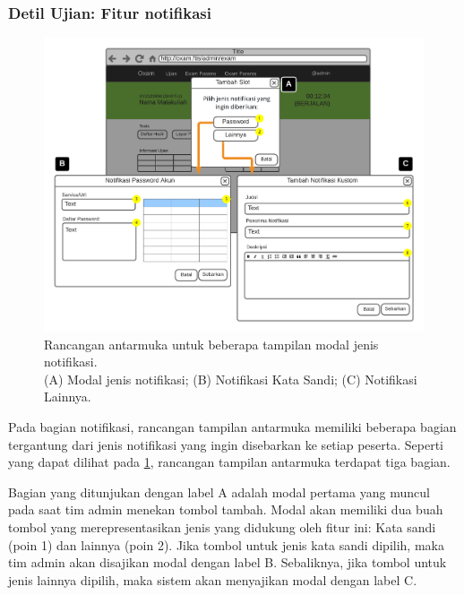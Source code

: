 \subsubsection{Detil Ujian: Fitur notifikasi}
    \begin{figure}
        \centering
        \includegraphics{Gambar/mockups/Mockup--Admin - Notif.pdf}
        \caption{Rancangan antarmuka untuk beberapa tampilan modal jenis notifikasi. \\
            (A) Modal jenis notifikasi; (B) Notifikasi Kata Sandi; (C) Notifikasi Lainnya.}
        \label{fig:mockup_admin_exam_det_notif}
    \end{figure}
    
    Pada bagian notifikasi, rancangan tampilan antarmuka memiliki beberapa bagian tergantung dari
    jenis notifikasi yang ingin disebarkan ke setiap peserta. Seperti yang dapat dilihat pada
    \ref{fig:mockup_admin_exam_det_notif}, rancangan tampilan antarmuka terdapat tiga bagian.
    
    Bagian yang ditunjukan dengan label A adalah modal pertama yang muncul pada saat tim admin
    menekan tombol tambah. Modal akan memiliki dua buah tombol yang merepresentasikan jenis
    yang didukung oleh fitur ini: Kata sandi (poin 1) dan lainnya (poin 2). Jika tombol untuk jenis kata sandi
    dipilih, maka tim admin akan disajikan modal dengan label B. Sebaliknya, jika tombol untuk jenis lainnya
    dipilih, maka sistem akan menyajikan modal dengan label C.
    
